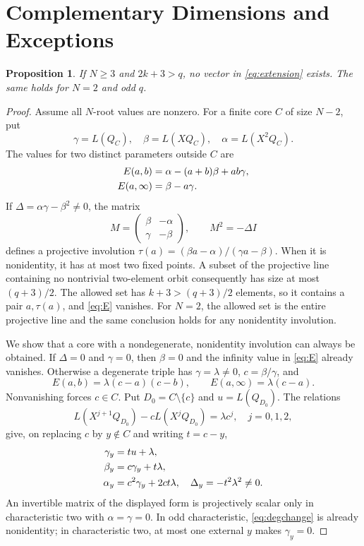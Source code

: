 \documentclass[12pt,letterpaper,onecolumn]{article}
\newtheorem{proposition}[theorem]{Proposition}
\theoremstyle{definition}
\begin{document}
\section{Complementary Dimensions and Exceptions}
\begin{proposition}\label{prop:small}
If $N\ge3$ and $2k+3>q$, no vector in \eqref{eq:extension} exists. The same holds for $N=2$ and odd $q$.
\end{proposition}
\begin{proof}
Assume all $N$-root values are nonzero. For a finite core $C$ of size $N-2$, put
\[
 \gamma=L(Q_C),\quad\beta=L(XQ_C),\quad\alpha=L(X^2Q_C).
\]
The values for two distinct parameters outside $C$ are
\begin{align}
 E(a,b)&=\alpha-(a+b)\beta+ab\gamma,\notag\\
 E(a,\infty)&=\beta-a\gamma.\label{eq:E}
\end{align}
If $\Delta=\alpha\gamma-\beta^2\ne0$, the matrix
\[
 M=\begin{pmatrix}\beta&-\alpha\\\gamma&-\beta\end{pmatrix},
 \qquad M^2=-\Delta I
\]
defines a projective involution $\tau(a)=(\beta a-\alpha)/(\gamma a-\beta)$. When it is nonidentity, it has at most two fixed points. A subset of the projective line containing no nontrivial two-element orbit consequently has size at most $(q+3)/2$. The allowed set has $k+3>(q+3)/2$ elements, so it contains a pair $a,\tau(a)$, and \eqref{eq:E} vanishes. For $N=2$, the allowed set is the entire projective line and the same conclusion holds for any nonidentity involution.

We show that a core with a nondegenerate, nonidentity involution can always be obtained. If $\Delta=0$ and $\gamma=0$, then $\beta=0$ and the infinity value in \eqref{eq:E} already vanishes. Otherwise a degenerate triple has $\gamma=\lambda\ne0$, $c=\beta/\gamma$, and
\[
 E(a,b)=\lambda(c-a)(c-b),\qquad E(a,\infty)=\lambda(c-a).
\]
Nonvanishing forces $c\in C$. Put $D_0=C\setminus\{c\}$ and $u=L(Q_{D_0})$. The relations
\[
 L(X^{j+1}Q_{D_0})-cL(X^jQ_{D_0})=\lambda c^j,
 \quad j=0,1,2,
\]
give, on replacing $c$ by $y\notin C$ and writing $t=c-y$,
\begin{align}
 \gamma_y&=tu+\lambda,\notag\\
 \beta_y&=c\gamma_y+t\lambda,\notag\\
 \alpha_y&=c^2\gamma_y+2ct\lambda,\quad
 \Delta_y=-t^2\lambda^2\ne0.\label{eq:degchange}
\end{align}
An invertible matrix of the displayed form is projectively scalar only in characteristic two with $\alpha=\gamma=0$. In odd characteristic, \eqref{eq:degchange} is already nonidentity; in characteristic two, at most one external $y$ makes $\gamma_y=0$.


\end{proof}
\end{document}
